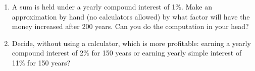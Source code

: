 \begin{multicols}{2}
\begin{enumerate}[ref={\fcProblemRef}]
\item \label{problemEasLimitAndCompoundInterest1procentInterest200years} A sum is held under a yearly compound interest of 1\%. Make an approximation by hand (no calculators allowed) by what factor will have the money increased after 200 years. Can you do the computation in your head?
\item \label{problemEasLimitAndCompoundInterestWhatIsMorecompoundInterest2percent150yearsOrsimpleInterest11percent} Decide, without using a calculator, which is more profitable: earning a yearly compound interest of 2\% for 150 years or earning yearly simple interest of 11\% for 150 years?
\end{enumerate}
\end{multicols}